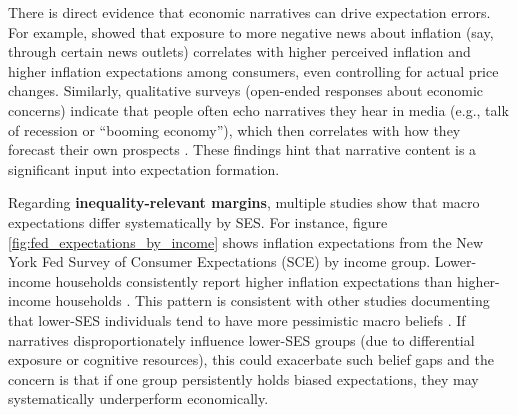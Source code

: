 \documentclass[12pt]{article}
\begin{document}
There is direct evidence that economic narratives can drive expectation errors. For example, \citet{ArmantierEtAl2016PriceIsRight} showed that exposure to more negative news about inflation (say, through certain news outlets) correlates with higher perceived inflation and higher inflation expectations among consumers, even controlling for actual price changes. Similarly, qualitative surveys (open-ended responses about economic concerns) indicate that people often echo narratives they hear in media (e.g., talk of recession or ``booming economy''), which then correlates with how they forecast their own prospects \citep{Shiller2017}. These findings hint that narrative content is a significant input into expectation formation.

Regarding \textbf{inequality-relevant margins}, multiple studies show that macro expectations differ systematically by SES. For instance, figure \ref{fig:fed_expectations_by_income} shows inflation expectations from the New York Fed Survey of Consumer Expectations (SCE) by income group. Lower-income households consistently report higher inflation expectations than higher-income households \citep{doh_lee_park_2024_rwp2406}. This pattern is consistent with other studies documenting that lower-SES individuals tend to have more pessimistic macro beliefs \citep{ArmantierEtAl2016PriceIsRight}. If narratives disproportionately influence lower-SES groups (due to differential exposure or cognitive resources), this could exacerbate such belief gaps and the concern is that if one group persistently holds biased expectations, they may systematically underperform economically.
\end{document}
